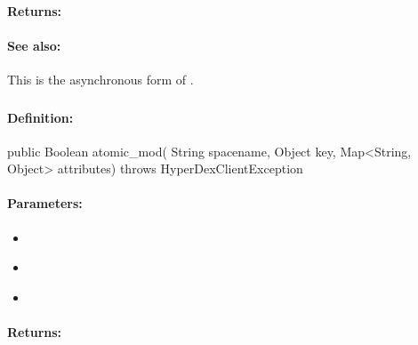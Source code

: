\paragraph{Returns:}


\paragraph{See also:}  This is the asynchronous form of .

\pagebreak
\subsubsection{}
\label{api:java:atomic_mod}


\paragraph{Definition:}
\begin{javacode}
public Boolean atomic_mod(
        String spacename,
        Object key,
        Map<String, Object> attributes) throws HyperDexClientException
\end{javacode}

\paragraph{Parameters:}
\begin{itemize}[noitemsep]
\item {}\\

\item {}\\

\item {}\\

\end{itemize}

\paragraph{Returns:}


